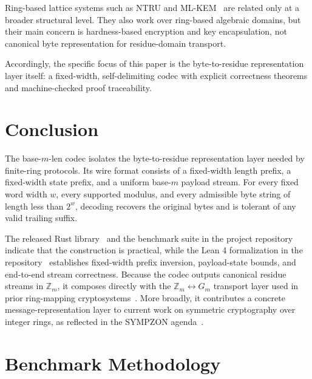 \documentclass{system-security-article}
\newcommand{\Zm}{\ensuremath{\mathbb{Z}_m}}
\newcommand{\Gm}{\ensuremath{G_m}}
\newcommand{\BaseM}{base-\(m\)}
\newcommand{\BaseMLen}{\BaseM{}-len}
\begin{document}
    Ring-based lattice systems such as NTRU and ML-KEM~\cite{ntru1998,nist2024post} are related only at a broader structural level.
    They also work over ring-based algebraic domains, but their main concern is hardness-based encryption and key encapsulation,
    not canonical byte representation for residue-domain transport.

    Accordingly, the specific focus of this paper is the byte-to-residue representation layer itself:
    a fixed-width, self-delimiting codec with explicit correctness theorems and machine-checked proof traceability.

    \section{Conclusion}
    \label{sec:conclusion}

    The \BaseMLen{} codec isolates the byte-to-residue representation layer needed by finite-ring protocols.
    Its wire format consists of a fixed-width length prefix, a fixed-width state prefix, and a uniform \BaseM{} payload stream.
    For every fixed word width \(w\), every supported modulus, and every admissible byte string of length less than \(2^{w}\),
    decoding recovers the original bytes and is tolerant of any valid trailing suffix.

    The released Rust library~\cite{riabov2026encodingcrate} and the benchmark suite in the
    project repository indicate that the construction is practical,
    while the Lean 4 formalization in the repository~\cite{riabov2026encodingrepo}
    establishes fixed-width prefix inversion, payload-state bounds, and end-to-end stream correctness.
    Because the codec outputs canonical residue streams in \(\Zm\), it composes directly
    with the \(\Zm \leftrightarrow \Gm\) transport layer used in prior ring-mapping
    cryptosystems~\cite{kryvyi2022symmetric,kryvyi2025symmetric}.
    More broadly, it contributes a concrete message-representation layer to current work on
    symmetric cryptography over integer rings, as reflected in the SYMPZON agenda~\cite{sympzon}.

    \appendix

    \section{Benchmark Methodology}
    \label{sec:bench}
\end{document}
